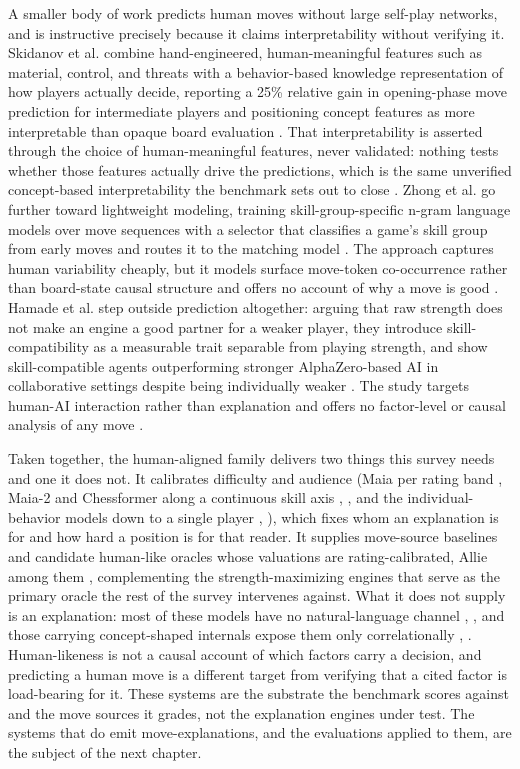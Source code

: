 \documentclass[conference]{IEEEtran}
\begin{document}
A smaller body of work predicts human moves without large self-play networks, and is instructive precisely because it claims interpretability without verifying it. Skidanov et al. combine hand-engineered, human-meaningful features such as material, control, and threats with a behavior-based knowledge representation of how players actually decide, reporting a 25\% relative gain in opening-phase move prediction for intermediate players and positioning concept features as more interpretable than opaque board evaluation \cite{ref62}. That interpretability is asserted through the choice of human-meaningful features, never validated: nothing tests whether those features actually drive the predictions, which is the same unverified concept-based interpretability the benchmark sets out to close \cite{ref62}. Zhong et al. go further toward lightweight modeling, training skill-group-specific n-gram language models over move sequences with a selector that classifies a game's skill group from early moves and routes it to the matching model \cite{ref63}. The approach captures human variability cheaply, but it models surface move-token co-occurrence rather than board-state causal structure and offers no account of why a move is good \cite{ref63}. Hamade et al. step outside prediction altogether: arguing that raw strength does not make an engine a good partner for a weaker player, they introduce skill-compatibility as a measurable trait separable from playing strength, and show skill-compatible agents outperforming stronger AlphaZero-based AI in collaborative settings despite being individually weaker \cite{ref60}. The study targets human-AI interaction rather than explanation and offers no factor-level or causal analysis of any move \cite{ref60}.

Taken together, the human-aligned family delivers two things this survey needs and one it does not. It calibrates difficulty and audience (Maia per rating band \cite{ref20}, Maia-2 and Chessformer along a continuous skill axis \cite{ref9}, \cite{ref8}, and the individual-behavior models down to a single player \cite{ref49}, \cite{ref48}), which fixes whom an explanation is for and how hard a position is for that reader. It supplies move-source baselines and candidate human-like oracles whose valuations are rating-calibrated, Allie among them \cite{ref10}, complementing the strength-maximizing engines that serve as the primary oracle the rest of the survey intervenes against. What it does not supply is an explanation: most of these models have no natural-language channel \cite{ref9}, \cite{ref8}, and those carrying concept-shaped internals expose them only correlationally \cite{ref8}, \cite{ref62}. Human-likeness is not a causal account of which factors carry a decision, and predicting a human move is a different target from verifying that a cited factor is load-bearing for it. These systems are the substrate the benchmark scores against and the move sources it grades, not the explanation engines under test. The systems that do emit move-explanations, and the evaluations applied to them, are the subject of the next chapter.
\end{document}
